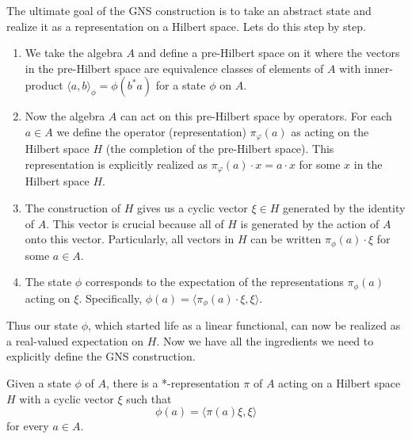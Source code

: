 The ultimate goal of the GNS construction is to take an abstract state
and realize it as a representation on a Hilbert space. Lets do this step by step.
\begin{enumerate}
    \item We take the algebra $A$ and define a pre-Hilbert space on it where the vectors
    in the pre-Hilbert space are equivalence classes of elements of $A$ with inner-product
    $\langle a, b \rangle_\phi = \phi(b^*a)$ for a state $\phi$ on $A$.
    \item Now the algebra $A$ can act on this pre-Hilbert space by operators. For
    each $a \in A$ we define the operator (representation) $\pi_\varphi (a)$ as acting
    on the Hilbert space $H$ (the completion of the pre-Hilbert space). This representation
    is explicitly realized as $\pi_\varphi(a) \cdot x = a \cdot x$ for some $x$ in
    the Hilbert space $H$.
    \item The construction of $H$ gives us a cyclic vector $\xi \in H$ generated by
    the identity of $A$. This vector is crucial because all of $H$ is generated
    by the action of $A$ onto this vector. Particularly, all vectors in $H$ can
    be written $\pi_\phi(a) \cdot \xi$ for some $a \in A$.
    \item The state $\phi$ corresponds to the expectation of the representations
    $\pi_\phi(a)$ acting on $\xi$. Specifically, $\phi(a) = \langle \pi_\phi(a) \cdot \xi, \xi \rangle$.
\end{enumerate}
Thus our state $\phi$, which started life as a linear functional, can now be realized
as a real-valued expectation on $H$. Now we have all the ingredients we need to
explicitly define the GNS construction.

\begin{theorem}
    Given a state $\phi$ of $A$, there is a *-representation $\pi$ of $A$ acting
    on a Hilbert space $H$ with a cyclic vector $\xi$ such that
    \begin{equation*}
        \phi(a) = \langle \pi(a)\xi , \xi \rangle
    \end{equation*}
    for every $a \in A$.
\end{theorem}


